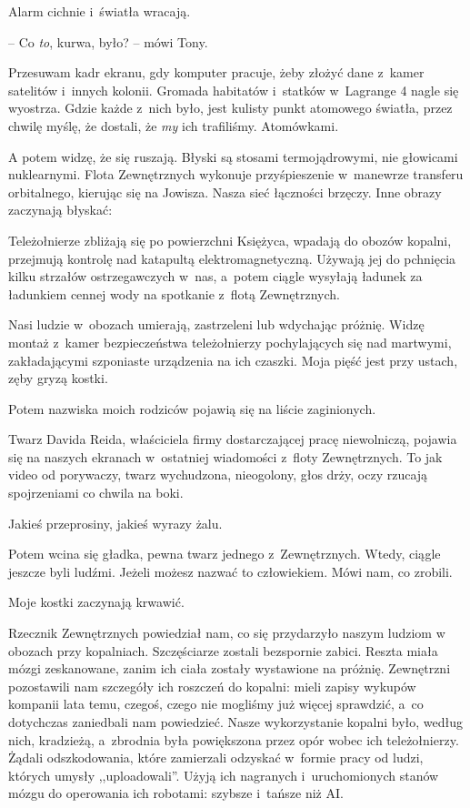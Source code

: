 \documentclass[oneside,polish,11pt,sfheadings]{mwbk}
\begin{document}
Alarm cichnie i~światła wracają.

-- Co \textit{to}, kurwa, było? -- mówi Tony.

Przesuwam kadr ekranu, gdy komputer pracuje, żeby złożyć dane z~kamer
satelitów i~innych kolonii. Gromada habitatów i~statków w~Lagrange 4
nagle się wyostrza. Gdzie każde z~nich było, jest kulisty punkt
atomowego światła, przez chwilę myślę, że dostali, że \textit{my} ich
trafiliśmy. Atomówkami.

A potem widzę, że się ruszają. Błyski są stosami termojądrowymi, nie
głowicami nuklearnymi. Flota Zewnętrznych wykonuje przyśpieszenie w~manewrze transferu orbitalnego, kierując się na Jowisza. Nasza sieć
łączności brzęczy. Inne obrazy zaczynają błyskać:

Teleżołnierze zbliżają się po powierzchni Księżyca, wpadają do obozów
kopalni, przejmują kontrolę nad katapultą elektromagnetyczną. Używają
jej do pchnięcia kilku strzałów ostrzegawczych w~nas, a~potem ciągle
wysyłają ładunek za ładunkiem cennej wody na spotkanie z~flotą
Zewnętrznych.

Nasi ludzie w~obozach umierają, zastrzeleni lub wdychając próżnię. Widzę
montaż z~kamer bezpieczeństwa teleżołnierzy pochylających się nad
martwymi, zakładającymi szponiaste urządzenia na ich czaszki. Moja pięść
jest przy ustach, zęby gryzą kostki.

Potem nazwiska moich rodziców pojawią się na liście zaginionych.

Twarz Davida Reida, właściciela firmy dostarczającej pracę niewolniczą,
pojawia się na naszych ekranach w~ostatniej wiadomości z~floty
Zewnętrznych. To jak video od porywaczy, twarz wychudzona, nieogolony,
głos drży, oczy rzucają spojrzeniami co chwila na boki.

Jakieś przeprosiny, jakieś wyrazy żalu.

Potem wcina się gładka, pewna twarz jednego z~Zewnętrznych. Wtedy,
ciągle jeszcze byli ludźmi. Jeżeli możesz nazwać to człowiekiem. Mówi
nam, co zrobili.

Moje kostki zaczynają krwawić.

Rzecznik Zewnętrznych powiedział nam, co się przydarzyło naszym ludziom
w obozach przy kopalniach. Szczęściarze zostali bezspornie zabici.
Reszta miała mózgi zeskanowane, zanim ich ciała zostały wystawione na
próżnię. Zewnętrzni pozostawili nam szczegóły ich roszczeń do kopalni:
mieli zapisy wykupów kompanii lata temu, czegoś, czego nie mogliśmy już
więcej sprawdzić, a~co dotychczas zaniedbali nam powiedzieć. Nasze
wykorzystanie kopalni było, według nich, kradzieżą, a~zbrodnia była
powiększona przez opór wobec ich teleżołnierzy. Żądali odszkodowania,
które zamierzali odzyskać w~formie pracy od ludzi, których umysły
,,uploadowali''. Użyją ich nagranych i~uruchomionych stanów mózgu do
operowania ich robotami: szybsze i~tańsze niż AI.
\end{document}
